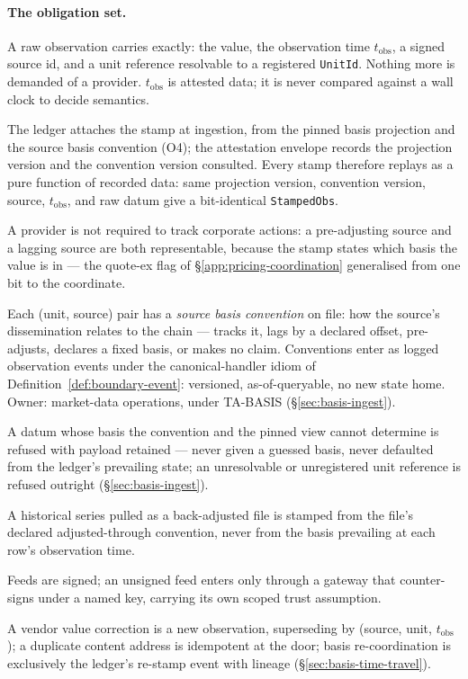 \paragraph{The obligation set.}
\begin{description}[style=nextline]
\item[O1 (raw observation).] A raw observation carries exactly: the value, the
observation time $t_{\mathrm{obs}}$, a signed source id, and a unit reference
resolvable to a registered \texttt{UnitId}. Nothing more is demanded of a provider.
$t_{\mathrm{obs}}$ is attested data; it is never compared against a wall clock to
decide semantics.
\item[O2 (the stamp).] The ledger attaches the stamp at ingestion, from the pinned
basis projection and the source basis convention (O4); the attestation envelope
records the projection version and the convention version consulted. Every stamp
therefore replays as a pure function of recorded data: same projection version,
convention version, source, $t_{\mathrm{obs}}$, and raw datum give a bit-identical
\texttt{StampedObs}.
\item[O3 (no corporate-action awareness).] A provider is not required to track
corporate actions: a pre-adjusting source and a lagging source are both
representable, because the stamp states which basis the value is in --- the quote-ex
flag of \S\ref{app:pricing-coordination} generalised from one bit to the coordinate.
\item[O4 (source basis convention).] Each (unit, source) pair has a \emph{source
basis convention} on file: how the source's dissemination relates to the chain ---
tracks it, lags by a declared offset, pre-adjusts, declares a fixed basis, or makes
no claim. Conventions enter as logged observation events under the canonical-handler
idiom of Definition~\ref{def:boundary-event}: versioned, as-of-queryable, no new
state home. Owner: market-data operations, under TA-BASIS
(\S\ref{sec:basis-ingest}).
\item[O5 (fail-closed).] A datum whose basis the convention and the pinned view
cannot determine is refused with payload retained --- never given a guessed basis,
never defaulted from the ledger's prevailing state; an unresolvable or unregistered
unit reference is refused outright (\S\ref{sec:basis-ingest}).
\item[O6 (back-adjusted files).] A historical series pulled as a back-adjusted file
is stamped from the file's declared adjusted-through convention, never from the
basis prevailing at each row's observation time.
\item[O7 (signature).] Feeds are signed; an unsigned feed enters only through a
gateway that counter-signs under a named key, carrying its own scoped trust
assumption.
\item[O8 (corrections).] A vendor value correction is a new observation, superseding
by (source, unit, $t_{\mathrm{obs}}$); a duplicate content address is idempotent at
the door; basis re-coordination is exclusively the ledger's re-stamp event with
lineage (\S\ref{sec:basis-time-travel}).
\end{description}

